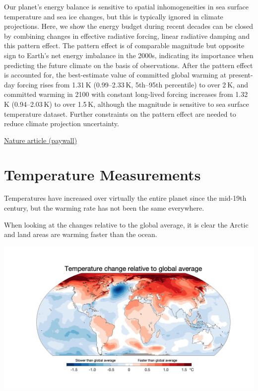\documentclass[
]{book}
\begin{document}
Our planet's energy balance is sensitive to spatial inhomogeneities in sea surface temperature and sea ice changes, but this is typically ignored in climate projections. Here, we show the energy budget during recent decades can be closed by combining changes in effective radiative forcing, linear radiative damping and this pattern effect. The pattern effect is of comparable magnitude but opposite sign to Earth's net energy imbalance in the 2000s, indicating its importance when predicting the future climate on the basis of observations. After the pattern effect is accounted for, the best-estimate value of committed global warming at present-day forcing rises from 1.31 K (0.99--2.33 K, 5th--95th percentile) to over 2 K, and committed warming in 2100 with constant long-lived forcing increases from 1.32 K (0.94--2.03 K) to over 1.5 K, although the magnitude is sensitive to sea surface temperature dataset. Further constraints on the pattern effect are needed to reduce climate projection uncertainty.

\href{https://www.nature.com/articles/s41558-020-00955-x}{Nature article (paywall)}

\hypertarget{temperature-measurements}{%
\chapter{Temperature Measurements}\label{temperature-measurements}}

Temperatures have increased over virtually the entire planet since the mid-19th century, but the warming rate has not been the same everywhere.

When looking at the changes relative to the global average, it is clear the Arctic and land areas are warming faster than the ocean.

\includegraphics{fig/World_Temp_Change_Speed.jpeg}
\end{document}
